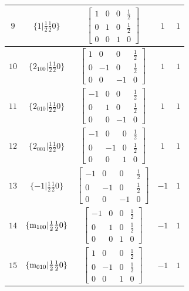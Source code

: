 \documentclass[fleqn,8pt]{jsarticle}
\begin{document}
\begin{longtable}{ccccc}
$ 9 $ & $ \{1|\frac{1}{2} \frac{1}{2} 0\} $ & $ \begin{bmatrix} 1 & 0 & 0 & \frac{1}{2} \\ 0 & 1 & 0 & \frac{1}{2} \\ 0 & 0 & 1 & 0 \end{bmatrix} $ & $ 1 $ & $ 1 $ \\ \hline
$ 10 $ & $ \{2{}_{100}|\frac{1}{2} \frac{1}{2} 0\} $ & $ \begin{bmatrix} 1 & 0 & 0 & \frac{1}{2} \\ 0 & -1 & 0 & \frac{1}{2} \\ 0 & 0 & -1 & 0 \end{bmatrix} $ & $ 1 $ & $ 1 $ \\ \hline
$ 11 $ & $ \{2{}_{010}|\frac{1}{2} \frac{1}{2} 0\} $ & $ \begin{bmatrix} -1 & 0 & 0 & \frac{1}{2} \\ 0 & 1 & 0 & \frac{1}{2} \\ 0 & 0 & -1 & 0 \end{bmatrix} $ & $ 1 $ & $ 1 $ \\ \hline
$ 12 $ & $ \{2{}_{001}|\frac{1}{2} \frac{1}{2} 0\} $ & $ \begin{bmatrix} -1 & 0 & 0 & \frac{1}{2} \\ 0 & -1 & 0 & \frac{1}{2} \\ 0 & 0 & 1 & 0 \end{bmatrix} $ & $ 1 $ & $ 1 $ \\ \hline
$ 13 $ & $ \{-1|\frac{1}{2} \frac{1}{2} 0\} $ & $ \begin{bmatrix} -1 & 0 & 0 & \frac{1}{2} \\ 0 & -1 & 0 & \frac{1}{2} \\ 0 & 0 & -1 & 0 \end{bmatrix} $ & $ -1 $ & $ 1 $ \\ \hline
$ 14 $ & $ \{{\rm m}_{100}|\frac{1}{2} \frac{1}{2} 0\} $ & $ \begin{bmatrix} -1 & 0 & 0 & \frac{1}{2} \\ 0 & 1 & 0 & \frac{1}{2} \\ 0 & 0 & 1 & 0 \end{bmatrix} $ & $ -1 $ & $ 1 $ \\ \hline
$ 15 $ & $ \{{\rm m}_{010}|\frac{1}{2} \frac{1}{2} 0\} $ & $ \begin{bmatrix} 1 & 0 & 0 & \frac{1}{2} \\ 0 & -1 & 0 & \frac{1}{2} \\ 0 & 0 & 1 & 0 \end{bmatrix} $ & $ -1 $ & $ 1 $ \\ \hline

\end{longtable}
\end{document}
